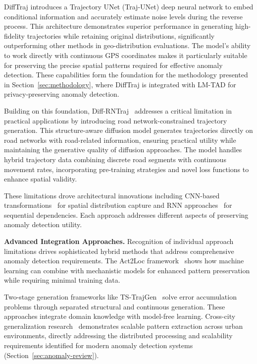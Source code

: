 DiffTraj introduces a Trajectory UNet (Traj-UNet) deep neural network to embed conditional information and accurately estimate noise levels during the reverse process. This architecture demonstrates superior performance in generating high-fidelity trajectories while retaining original distributions, significantly outperforming other methods in geo-distribution evaluations. The model's ability to work directly with continuous GPS coordinates makes it particularly suitable for preserving the precise spatial patterns required for effective anomaly detection. These capabilities form the foundation for the methodology presented in Section~\ref{sec:methodology}, where DiffTraj is integrated with LM-TAD for privacy-preserving anomaly detection.

Building on this foundation, Diff-RNTraj~\cite{weiDiffRNTrajStructureawareDiffusion2024} addresses a critical limitation in practical applications by introducing road network-constrained trajectory generation. This structure-aware diffusion model generates trajectories directly on road networks with road-related information, ensuring practical utility while maintaining the generative quality of diffusion approaches. The model handles hybrid trajectory data combining discrete road segments with continuous movement rates, incorporating pre-training strategies and novel loss functions to enhance spatial validity.

These limitations drove architectural innovations including CNN-based transformations~\cite{merhiSyntheticTrajectoryGeneration2024} for spatial distribution capture and RNN approaches~\cite{duRecurrentMarkedTemporal2016} for sequential dependencies. Each approach addresses different aspects of preserving anomaly detection utility.

\textbf{Advanced Integration Approaches.} Recognition of individual approach limitations drives sophisticated hybrid methods that address comprehensive anomaly detection requirements. The Act2Loc framework~\cite{liuAct2LocSyntheticTrajectory2023} shows how machine learning can combine with mechanistic models for enhanced pattern preservation while requiring minimal training data.

Two-stage generation frameworks like TS-TrajGen~\cite{jiangContinuousTrajectoryGeneration2023} solve error accumulation problems through separated structural and continuous generation. These approaches integrate domain knowledge with model-free learning. Cross-city generalization research~\cite{wangGTGGeneralizableTrajectory2025} demonstrates scalable pattern extraction across urban environments, directly addressing the distributed processing and scalability requirements identified for modern anomaly detection systems (Section~\ref{sec:anomaly-review}).

